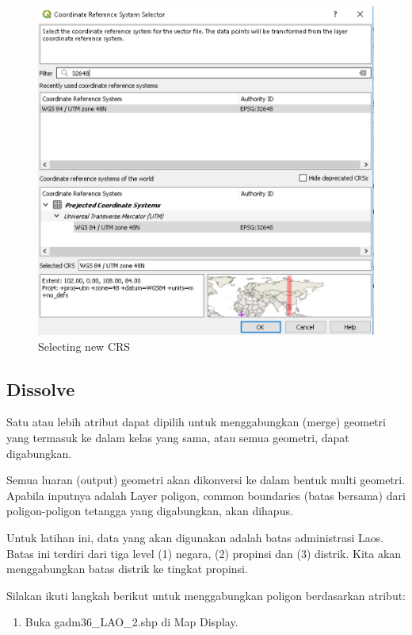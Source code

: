 \documentclass[]{book}
\providecommand{\tightlist}{%
  \setlength{\itemsep}{0pt}\setlength{\parskip}{0pt}}
\begin{document}
\begin{figure}

{\centering \includegraphics[width=0.7\linewidth]{images/04/fig28} 

}

\caption{Selecting new CRS}\label{fig:fig1428}
\end{figure}

\hypertarget{dissolve}{%
\subsection{Dissolve}\label{dissolve}}

Satu atau lebih atribut dapat dipilih untuk menggabungkan (merge) geometri yang termasuk ke dalam kelas yang sama, atau semua geometri, dapat digabungkan.

Semua luaran (output) geometri akan dikonversi ke dalam bentuk multi geometri. Apabila inputnya adalah Layer poligon, common boundaries (batas bersama) dari poligon-poligon tetangga yang digabungkan, akan dihapus.

Untuk latihan ini, data yang akan digunakan adalah batas administrasi Laos. Batas ini terdiri dari tiga level (1) negara, (2) propinsi dan (3) distrik. Kita akan menggabungkan batas distrik ke tingkat propinsi.

Silakan ikuti langkah berikut untuk menggabungkan poligon berdasarkan atribut:

\begin{enumerate}
\def\labelenumi{\arabic{enumi}.}
\tightlist
\item
  Buka gadm36\_LAO\_2.shp di Map Display.
\end{enumerate}
\end{document}
